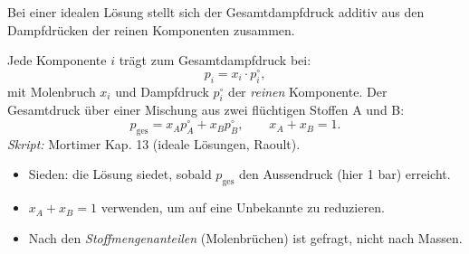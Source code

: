 

Bei einer idealen Lösung stellt sich der Gesamtdampfdruck additiv aus den
Dampfdrücken der reinen Komponenten zusammen.

\begin{werkzeugkasten}
Jede Komponente $i$ trägt zum Gesamtdampfdruck bei:
\[
  p_i = x_i \cdot p_i^\circ,
\]
mit Molenbruch $x_i$ und Dampfdruck $p_i^\circ$ der \emph{reinen}
Komponente. Der Gesamtdruck über einer Mischung aus zwei flüchtigen Stoffen
A und B:
\[
  p_{\text{ges}} = x_A p_A^\circ + x_B p_B^\circ,\qquad
  x_A + x_B = 1 .
\]
\textit{Skript:} Mortimer Kap. 13 (ideale Lösungen, Raoult).
\end{werkzeugkasten}

\begin{achtung}
\begin{itemize}
  \item Sieden: die Lösung siedet, sobald $p_{\text{ges}}$ den Aussendruck
        (hier 1 bar) erreicht.
  \item $x_A+x_B=1$ verwenden, um auf eine Unbekannte zu reduzieren.
  \item Nach den \emph{Stoffmengenanteilen} (Molenbrüchen) ist gefragt,
        nicht nach Massen.
\end{itemize}
\end{achtung}
